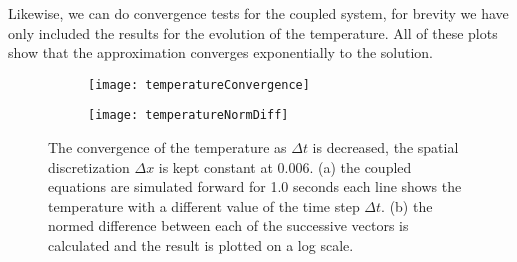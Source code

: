 Likewise, we can do convergence tests for the coupled system, for brevity we have only included the results for the evolution of the temperature. All of these plots show that the approximation converges exponentially to the solution.

\begin{figure}[b]
	\begin{subfigure}{0.49\textwidth}
		\texttt{[image: temperatureConvergence]}
	\end{subfigure}
	\begin{subfigure}{0.49\textwidth}
		\texttt{[image: temperatureNormDiff]}
	\end{subfigure}
\caption{The convergence of the temperature as $\Delta t$ is decreased, the spatial discretization $\Delta x$ is kept constant at 0.006. (a) the coupled equations are simulated forward for 1.0 seconds each line shows the temperature with a different value of the time step $\Delta t$. (b) the normed difference between each of the successive vectors is calculated and the result is plotted on  a log scale.}
\label{fig:temperatureConvergence}
\end{figure}